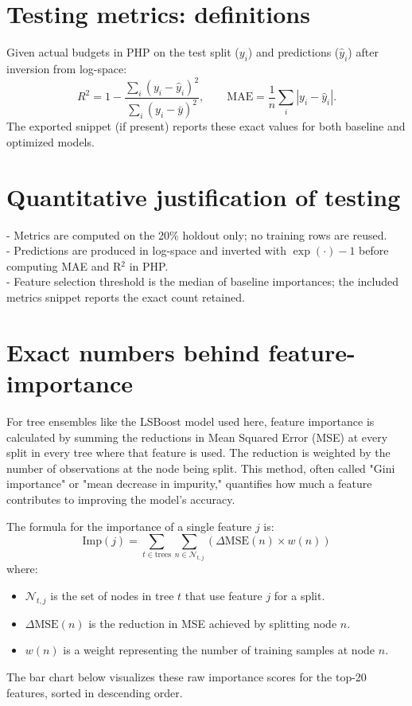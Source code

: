 \documentclass[11pt]{article}
\begin{document}
\section*{Testing metrics: definitions}
Given actual budgets in PHP on the test split ($y_i$) and predictions ($\hat{y}_i$) after inversion from log-space:
\[
R^2 = 1 - \frac{\sum_i (y_i-\hat{y}_i)^2}{\sum_i (y_i-\bar{y})^2},\qquad
\mathrm{MAE} = \frac{1}{n}\sum_i |y_i-\hat{y}_i|.
\]
The exported snippet (if present) reports these exact values for both baseline and optimized models.

\section*{Quantitative justification of testing}
- Metrics are computed on the 20\% holdout only; no training rows are reused.\\
- Predictions are produced in log-space and inverted with $\exp(\cdot)-1$ before computing MAE and R$^2$ in PHP.\\
- Feature selection threshold is the median of baseline importances; the included metrics snippet reports the exact count retained.

\section*{Exact numbers behind feature-importance}
For tree ensembles like the LSBoost model used here, feature importance is calculated by summing the reductions in Mean Squared Error (MSE) at every split in every tree where that feature is used. The reduction is weighted by the number of observations at the node being split. This method, often called "Gini importance" or "mean decrease in impurity," quantifies how much a feature contributes to improving the model's accuracy.

The formula for the importance of a single feature $j$ is:
\[
\mathrm{Imp}(j) = \sum_{t \in \text{trees}} \sum_{n \in \mathcal{N}_{t,j}} \left( \Delta\mathrm{MSE}(n) \times w(n) \right)
\]
where:
\begin{itemize}
    \item $\mathcal{N}_{t,j}$ is the set of nodes in tree $t$ that use feature $j$ for a split.
    \item $\Delta\mathrm{MSE}(n)$ is the reduction in MSE achieved by splitting node $n$.
    \item $w(n)$ is a weight representing the number of training samples at node $n$.
\end{itemize}
The bar chart below visualizes these raw importance scores for the top-20 features, sorted in descending order.
\end{document}
